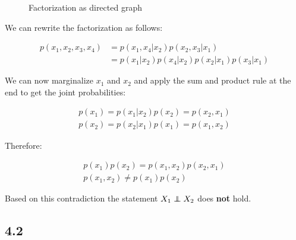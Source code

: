 \documentclass[a4paper]{article}
\newcommand\independent{\protect\mathpalette{\protect\independenT}{\perp}}
\def\independenT#1#2{\mathrel{\rlap{$#1#2$}\mkern2mu{#1#2}}}
\begin{document}
\begin{figure}[h]
\centering
\caption{Factorization as directed graph} \label{fig:directed_graph}
\end{figure}

We can rewrite the factorization as follows:

\begin{align*}
	p(x_1,x_2,x_3,x_4) &= p(x_1,x_4|x_2)p(x_2,x_3|x_1)\\
	&= p(x_1|x_2)p(x_4|x_2)p(x_2|x_1)p(x_3|x_1)
\end{align*}

We can now marginalize $x_1$ and $x_2$ and apply the sum and product rule at the end to get the joint probabilities:

\begin{align*}
	p(x_1) = p(x_1|x_2)p(x_2) = p(x_2, x_1)\\
	p(x_2) = p(x_2|x_1)p(x_1) = p(x_1, x_2)
\end{align*}

Therefore:

\begin{align*}
	p(x_1)p(x_2) = p(x_1,x_2)p(x_2,x_1)\\
	p(x_1, x_2) \neq p(x_1)p(x_2)
\end{align*}

Based on this contradiction the statement $X_1 \independent X_2$ does \textbf{not} hold.

\subsection*{4.2}
\end{document}
